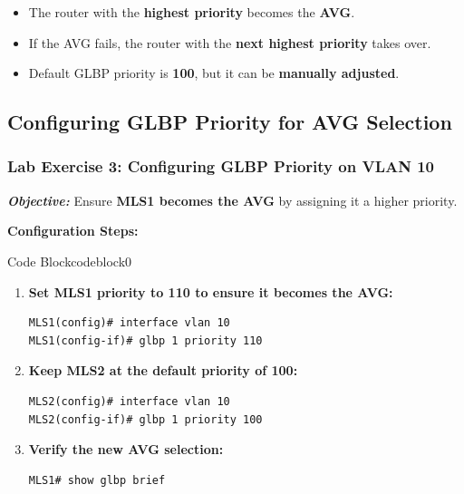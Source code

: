 \documentclass[a4paper]{book}
\begin{document}
\begin{itemize}
\item The router with the \textbf{highest priority} becomes the \textbf{AVG}.
\item If the AVG fails, the router with the \textbf{next highest priority} takes over.
\item Default GLBP priority is \textbf{100}, but it can be \textbf{manually adjusted}.
\end{itemize}

\subsection{Configuring GLBP Priority for AVG Selection}
\subsubsection{Lab Exercise 3: Configuring GLBP Priority on VLAN 10}
\textbf{\textit{Objective:}} Ensure \textbf{MLS1 becomes the AVG} by assigning it a higher priority.
\vspace{1.5em}

\textbf{Configuration Steps:}

\vspace{1.5em}


\begin{ocg}{Code Block}{codeblock}{0}

\vspace{0.5cm}

\begin{enumerate}
\item \textbf{Set MLS1 priority to 110 to ensure it becomes the AVG:}
\begin{lstlisting}
MLS1(config)# interface vlan 10
MLS1(config-if)# glbp 1 priority 110
\end{lstlisting}

\item \textbf{Keep MLS2 at the default priority of 100:}
\begin{lstlisting}
MLS2(config)# interface vlan 10
MLS2(config-if)# glbp 1 priority 100
\end{lstlisting}

\item \textbf{Verify the new AVG selection:}
\begin{lstlisting}
MLS1# show glbp brief
\end{lstlisting}
\end{enumerate}
\end{ocg}
\end{document}
